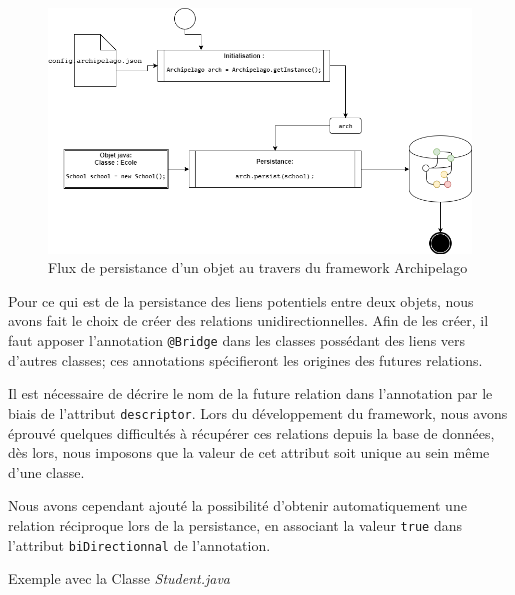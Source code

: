 \documentclass[a4paper,fleqn,12pt,oneside]{report}
\begin{document}
\begin{figure}[!h]
\centering
\includegraphics[scale=0.6]{figures/Persist.png}
\caption{Flux de persistance d'un objet au travers du framework Archipelago}
\label{fig:Persist}
\end{figure}
    
\newpage
Pour ce qui est de la persistance des liens potentiels entre deux objets, nous avons fait le choix de créer des relations unidirectionnelles. Afin de les créer, il faut apposer l'annotation \texttt{@Bridge} dans les classes possédant des liens vers d'autres classes; ces annotations spécifieront les origines des futures relations.

Il est nécessaire de décrire le nom de la future relation dans l'annotation par le biais de l'attribut \texttt{descriptor}. Lors du développement du framework, nous avons éprouvé quelques difficultés à récupérer ces relations depuis la base de données, dès lors, nous imposons que la valeur de cet attribut soit unique au sein même d'une classe. 

Nous avons cependant ajouté la possibilité d'obtenir automatiquement une relation réciproque lors de la persistance, en associant la valeur \texttt{true} dans l'attribut \texttt{biDirectionnal} de l'annotation. 

Exemple avec la Classe \textit{Student.java}
\end{document}
